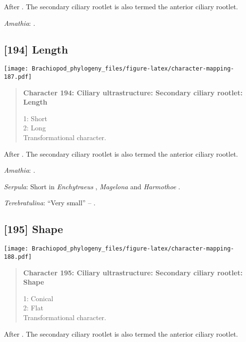 \documentclass[openany]{book}
\theoremstyle{definition}
\theoremstyle{definition}
\theoremstyle{definition}
\theoremstyle{remark}
\begin{document}
After \citet{Lundin2009}. The secondary ciliary rootlet is also termed
the anterior ciliary rootlet.

\hypertarget{Amathia-coding-193}{}
\emph{Amathia}: \citet{Reed1982}.

\subsection*{{[}194{]} Length}\label{length-1}

\texttt{[image: Brachiopod\_phylogeny\_files/figure-latex/character-mapping-187.pdf]}

\begin{quote}
\textbf{Character 194: Ciliary ultrastructure: Secondary ciliary
rootlet: Length}

1: Short\\
2: Long\\
Transformational character.
\end{quote}

After \citet{Lundin2009}. The secondary ciliary rootlet is also termed
the anterior ciliary rootlet.

\hypertarget{Amathia-coding-194}{}
\emph{Amathia}: \citet{Reed1982}.

\hypertarget{Serpula-coding-194}{}
\emph{Serpula}: Short in \emph{Enchytraeus} \citep{Reger1967},
\emph{Magelona} \citep{Bartolomaeus1995} and \emph{Harmothoe}
\citep{Holborow1969}.

\hypertarget{Terebratulina-coding-194}{}
\emph{Terebratulina}: ``Very small'' -- \citet{Luter1995}.

\subsection*{{[}195{]} Shape}\label{shape-1}

\texttt{[image: Brachiopod\_phylogeny\_files/figure-latex/character-mapping-188.pdf]}

\begin{quote}
\textbf{Character 195: Ciliary ultrastructure: Secondary ciliary
rootlet: Shape}

1: Conical\\
2: Flat\\
Transformational character.
\end{quote}

After \citet{Lundin2009}. The secondary ciliary rootlet is also termed
the anterior ciliary rootlet.
\end{document}
